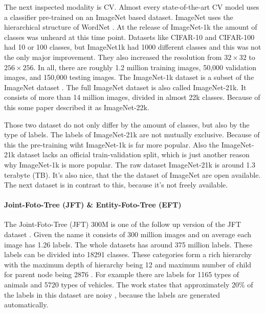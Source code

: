 \documentclass[
]{krantz}
\begin{document}
The next inspected modality is CV. Almost every state-of-the-art CV model uses a classifier pre-trained on an ImageNet based dataset. ImageNet uses the hierarchical structure of WordNet \citep{fellbaum2010wordnet}. At the release of ImageNet-1k the amount of classes was unheard at this time point. Datasets like CIFAR-10 \citep{krizhevsky2009learning} and CIFAR-100 \citep{krizhevsky2009learning} had 10 or 100 classes, but ImageNet1k had 1000 different classes and this was not the only major improvement. They also increased the resolution from \(32 \times 32\) to \(256 \times 256\). In all, there are roughly 1.2 million training images, 50,000 validation images, and 150,000 testing images. The ImageNet-1k dataset is a subset of the ImageNet dataset \citep{deng2009imagenet}. The full ImageNet dataset is also called ImageNet-21k. It consists of more than 14 million images, divided in almost 22k classes. Because of this some paper described it as ImageNet-22k.

Those two dataset do not only differ by the amount of classes, but also by the type of labels. The labels of ImageNet-21k are not mutually exclusive. Because of this the pre-training wiht ImageNet-1k is far more popular. Also the ImageNet-21k dataset lacks an official train-validation split, which is just another reason why ImageNet-1k is more popular. The raw dataset ImageNet-21k is around 1.3 terabyte (TB). It's also nice, that the the dataset of ImageNet are open available. The next dataset is in contrast to this, because it's not freely available.

\hypertarget{joint-foto-tree-jft-entity-foto-tree-eft}{%
\paragraph{Joint-Foto-Tree (JFT) \& Entity-Foto-Tree (EFT)}\label{joint-foto-tree-jft-entity-foto-tree-eft}}

The Joint-Foto-Tree (JFT) 300M is one of the follow up version of the JFT dataset \citep{hinton2015distilling}. Given the name it consists of 300 million images and on average each image has 1.26 labels. The whole datasets has around 375 million labels. These labels can be divided into 18291 classes. These categories form a rich hierarchy with the maximum depth of hierarchy being 12 and maximum number of child for parent node being 2876 \citep{sun2017revisiting}. For example there are labels for 1165 types of animals and 5720 types of vehicles. The work states that approximately 20\% of the labels in this dataset are noisy \citep{sun2017revisiting}, because the labels are generated automatically.
\end{document}
